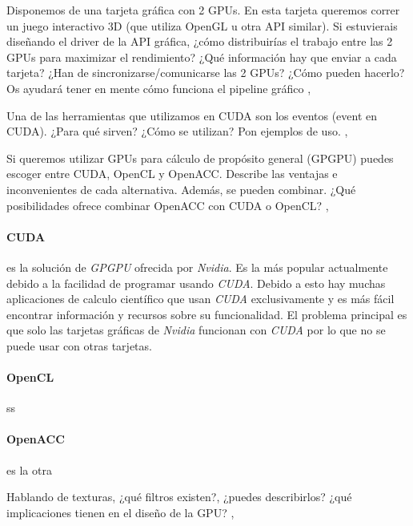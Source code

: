 \begin{pregunta}{Disponemos de una tarjeta gráfica con 2 GPUs. En esta tarjeta queremos
    correr un juego interactivo 3D (que utiliza OpenGL u otra API similar). Si
    estuvierais diseñando el driver de la API gráfica, ¿cómo distribuirías el
    trabajo entre las 2 GPUs para maximizar el rendimiento?  ¿Qué información
    hay que enviar a cada tarjeta? ¿Han de sincronizarse/comunicarse las 2 GPUs?
    ¿Cómo pueden hacerlo? Os ayudará tener en mente cómo funciona el pipeline
gráfico} \sep{}

\end{pregunta}
\begin{pregunta}{Una de las herramientas que utilizamos en CUDA son los eventos (event en
CUDA). ¿Para qué sirven? ¿Cómo se utilizan? Pon ejemplos de uso.} \sep{}

\end{pregunta}
\begin{pregunta}{Si queremos utilizar GPUs para cálculo de propósito general (GPGPU)
    puedes escoger entre CUDA, OpenCL y OpenACC. Describe las ventajas e
    inconvenientes de cada alternativa.  Además, se pueden combinar. ¿Qué
posibilidades ofrece combinar OpenACC con CUDA o OpenCL?} \sep{}

\paragraph{CUDA} es la solución de \emph{GPGPU} ofrecida por \emph{Nvidia}. Es la más
popular actualmente debido a la facilidad de programar usando \emph{CUDA}. Debido a esto
hay muchas aplicaciones de calculo científico que usan \emph{CUDA} exclusivamente y es más fácil
encontrar información y recursos sobre su funcionalidad. El problema principal es que solo
las tarjetas gráficas de \emph{Nvidia} funcionan con \emph{CUDA} por lo que no se puede usar
con otras tarjetas.

\paragraph{OpenCL} ss

\paragraph{OpenACC} es la otra

\end{pregunta}
\begin{pregunta}{Hablando de texturas, ¿qué filtros existen?, ¿puedes describirlos? ¿qué
implicaciones tienen en el diseño de la GPU?} \sep{}
\end{pregunta}
